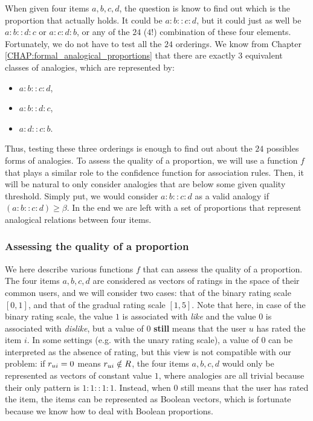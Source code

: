 When given four items $a, b, c, d$, the question is know to find out which is
the proportion that actually holds. It could be $a:b::c:d$, but it could just
as well be $a:b::d:c$ or $a:c:d:b$, or any of the $24$ ($4!$) combination of
these four elements. Fortunately, we do not have to test all the $24$
orderings.  We know from Chapter \ref{CHAP:formal_analogical_proportions} that
there are exactly 3 equivalent classes of analogies, which are represented by:
\begin{itemize}
  \item $a:b::c:d$,
  \item $a:b::d:c$,
  \item $a:d::c:b$.
\end{itemize}
Thus, testing these three orderings is enough to find out about the $24$
possibles forms of analogies. To assess the quality of a proportion, we will
use a function $f$ that plays a similar role to the confidence function for
association rules. Then, it will be natural to only consider analogies that
are below some given quality threshold. Simply put, we would consider
$a:b::c:d$ as a valid analogy if $(a:b::c:d) \geq \beta$. In the end we are
left with a set of proportions that represent analogical relations between four
items.

\subsubsection{Assessing the quality of a proportion}

We here describe various functions $f$ that can assess the quality of a
proportion. The four items $a, b, c, d$ are considered as vectors of ratings in
the space of their common users,
and we will consider two cases: that of the binary rating scale $[0, 1]$, and
that of the gradual rating scale $[1, 5]$. Note that here, in case of the
binary rating scale, the value $1$ is associated with \textit{like} and the
value $0$ is associated with \textit{dislike}, but a value of $0$
\textbf{still} means that the user $u$ has rated the item $i$. In some
settings (e.g. with the unary rating scale), a value of $0$ can be interpreted
as the absence of rating, but this view is not compatible with our problem: if
$r_{ui} = 0$ means $r_{ui} \notin R$, the four items $a, b, c, d$ would only be
represented as vectors of constant value $1$, where analogies are all trivial
because their only pattern is $1:1::1:1$. Instead, when $0$ still means that
the user has rated the item, the items can be represented as Boolean vectors,
which is fortunate because we know how to deal with Boolean proportions.

